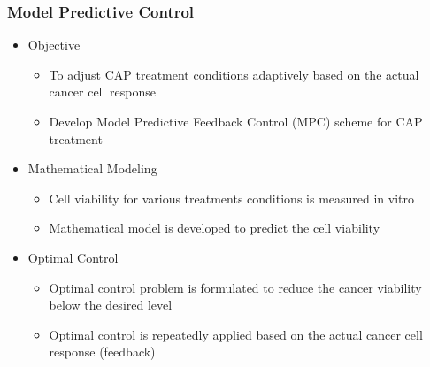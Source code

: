 \documentclass[hyperref={pdftex,pdfpagemode=none,pdfstartview=Fit}]{beamer}
\begin{document}
\begin{frame}
    \frametitle{Model Predictive Control}

    \begin{itemize}
        \item Objective
            \begin{itemize}
                \item To adjust CAP treatment conditions adaptively based on the actual cancer cell response
                \item Develop Model Predictive Feedback Control (MPC) scheme for CAP treatment
            \end{itemize}
            \vspace*{0.3cm}
        \item Mathematical Modeling
            \begin{itemize}
                \item Cell viability for various treatments conditions is measured in vitro
                \item Mathematical model is developed to predict the cell viability
            \end{itemize}
            \vspace*{0.3cm}
        \item Optimal Control
            \begin{itemize}
                \item Optimal control problem is formulated to reduce the cancer viability below the desired level
                \item Optimal control is repeatedly applied based on the actual cancer cell response (feedback)
            \end{itemize}
    \end{itemize}
\end{frame}
\end{document}
